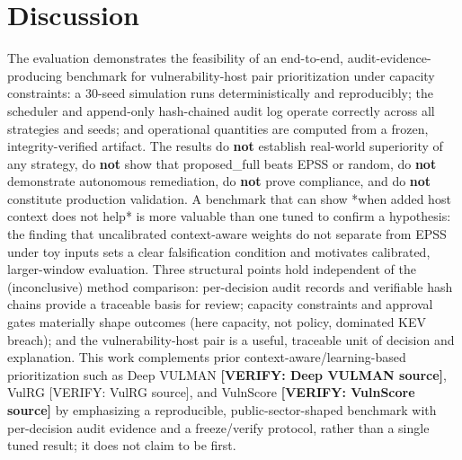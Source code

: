 \section{Discussion}

The evaluation demonstrates the feasibility of an end-to-end,
audit-evidence-producing benchmark for vulnerability-host pair prioritization under
capacity constraints: a 30-seed simulation runs deterministically and reproducibly;
the scheduler and append-only hash-chained audit log operate correctly across all
strategies and seeds; and operational quantities are computed from a frozen,
integrity-verified artifact. The results do \textbf{not} establish real-world
superiority of any strategy, do \textbf{not} show that proposed\_full beats EPSS or
random, do \textbf{not} demonstrate autonomous remediation, do \textbf{not} prove compliance,
and do \textbf{not} constitute production validation. A benchmark that can show *when
added host context does not help* is more valuable than one tuned to confirm a
hypothesis: the finding that uncalibrated context-aware weights do not separate
from EPSS under toy inputs sets a clear falsification condition and motivates
calibrated, larger-window evaluation. Three structural points hold independent of
the (inconclusive) method comparison: per-decision audit records and verifiable
hash chains provide a traceable basis for review; capacity constraints and approval
gates materially shape outcomes (here capacity, not policy, dominated KEV breach);
and the vulnerability-host pair is a useful, traceable unit of decision and
explanation. This work complements prior context-aware/learning-based
prioritization such as Deep VULMAN \textbf{[VERIFY: Deep VULMAN source]}, VulRG [VERIFY:
VulRG source], and VulnScore \textbf{[VERIFY: VulnScore source]} by emphasizing a
reproducible, public-sector-shaped benchmark with per-decision audit evidence and a
freeze/verify protocol, rather than a single tuned result; it does not claim to be
first.
